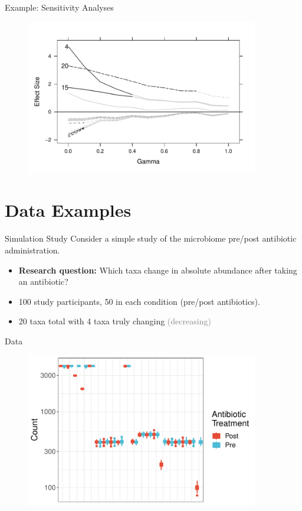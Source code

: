 \documentclass[
  ignorenonframetext,
]{beamer}
\begin{document}
\begin{frame}{Example: Sensitivity Analyses}
\protect\hypertarget{example-sensitivity-analyses}{}
\begin{figure}
  \centering
  \includegraphics[width=4in]{figures/sim_gamma.pdf}
\end{figure}
\end{frame}

\hypertarget{data-examples}{%
\section{Data Examples}\label{data-examples}}

\begin{frame}{Simulation Study}
\protect\hypertarget{simulation-study}{}
Consider a simple study of the microbiome pre/post antibiotic
administration.

\begin{itemize}
\item
  \textbf{Research question:} Which taxa change in absolute abundance
  after taking an antibiotic?
\item
  100 study participants, 50 in each condition (pre/post antibiotics).
\item
  20 taxa total with 4 taxa truly changing
  \textcolor{gray}{(decreasing)}
\end{itemize}
\end{frame}

\begin{frame}{Data}
\protect\hypertarget{data}{}
\begin{figure}
  \centering
  \includegraphics[width=4in]{figures/sim-data.pdf}
\end{figure}
\end{frame}
\end{document}
